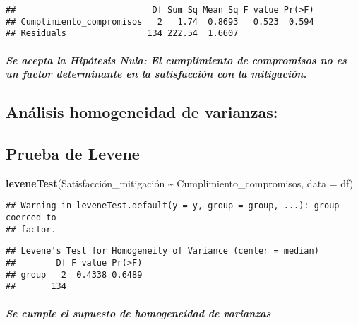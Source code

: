 \documentclass[
]{article}
\newenvironment{Shaded}{\begin{snugshade}}{\end{snugshade}}
\newcommand{\AttributeTok}[1]{\textcolor[rgb]{0.13,0.29,0.53}{#1}}
\newcommand{\FunctionTok}[1]{\textcolor[rgb]{0.13,0.29,0.53}{\textbf{#1}}}
\newcommand{\NormalTok}[1]{#1}
\newcommand{\SpecialCharTok}[1]{\textcolor[rgb]{0.81,0.36,0.00}{\textbf{#1}}}
\begin{document}
\begin{verbatim}
##                           Df Sum Sq Mean Sq F value Pr(>F)
## Cumplimiento_compromisos   2   1.74  0.8693   0.523  0.594
## Residuals                134 222.54  1.6607
\end{verbatim}

\subparagraph{\texorpdfstring{\emph{Se acepta la Hipótesis Nula: El
cumplimiento de compromisos no es un factor determinante en la
satisfacción con la
mitigación.}}{Se acepta la Hipótesis Nula: El cumplimiento de compromisos no es un factor determinante en la satisfacción con la mitigación.}}\label{se-acepta-la-hipuxf3tesis-nula-el-cumplimiento-de-compromisos-no-es-un-factor-determinante-en-la-satisfacciuxf3n-con-la-mitigaciuxf3n.}

\subsection{\texorpdfstring{\textbf{Análisis homogeneidad de
varianzas:}}{Análisis homogeneidad de varianzas:}}\label{anuxe1lisis-homogeneidad-de-varianzas}

\subsection{\texorpdfstring{\textbf{Prueba de
Levene}}{Prueba de Levene}}\label{prueba-de-levene-1}

\begin{Shaded}
\begin{Highlighting}[]
\FunctionTok{leveneTest}\NormalTok{(Satisfacción\_mitigación }\SpecialCharTok{\textasciitilde{}}\NormalTok{ Cumplimiento\_compromisos, }\AttributeTok{data =}\NormalTok{ df)}
\end{Highlighting}
\end{Shaded}

\begin{verbatim}
## Warning in leveneTest.default(y = y, group = group, ...): group coerced to
## factor.
\end{verbatim}

\begin{verbatim}
## Levene's Test for Homogeneity of Variance (center = median)
##        Df F value Pr(>F)
## group   2  0.4338 0.6489
##       134
\end{verbatim}

\subparagraph{\texorpdfstring{\emph{Se cumple el supuesto de
homogeneidad de
varianzas}}{Se cumple el supuesto de homogeneidad de varianzas}}\label{se-cumple-el-supuesto-de-homogeneidad-de-varianzas}
\end{document}
